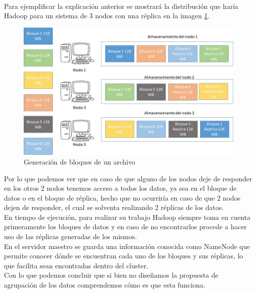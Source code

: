 \\
Para ejemplificar la explicación anterior se mostrará la distribución que haría Hadoop para un sistema de 3 nodos con una réplica en
la imagen \ref{fig:red3}.
\newpage
\begin{figure}[!htbp]
	\hypertarget{fig:red3}{\hspace{1pt}}
	\begin{center}
		\includegraphics[width=.7\textwidth]{capitulo3/images/im3.png}
		\caption{Generación de bloques de un archivo}
		\label{fig:red3}
	\end{center}
\end{figure}
Por lo que podemos ver que en caso de que alguno de los nodos deje de responder en los
otros 2 nodos tenemos acceso a todos los datos, ya sea en el bloque de datos o en el
bloque de réplica, hecho que no ocurriría en caso de que 2 nodos dejen de responder, el
cual se solventa realizando 2 réplicas de los datos.
\\
En tiempo de ejecución, para realizar su trabajo Hadoop siempre toma en cuenta primeramente los bloques de datos
y en caso de no encontrarlos procede a hacer uso de las réplicas generadas de los mismos.
\\
En el servidor maestro se guarda una información conocida como NameNode que permite
conocer dónde se encuentran cada uno de los bloques y sus réplicas, lo que facilita sean encontradas dentro del cluster.
\\
Con lo que podemos concluir que si bien no diseñamos la propuesta de agrupación de los datos comprendemos cómo es que esta funciona.
